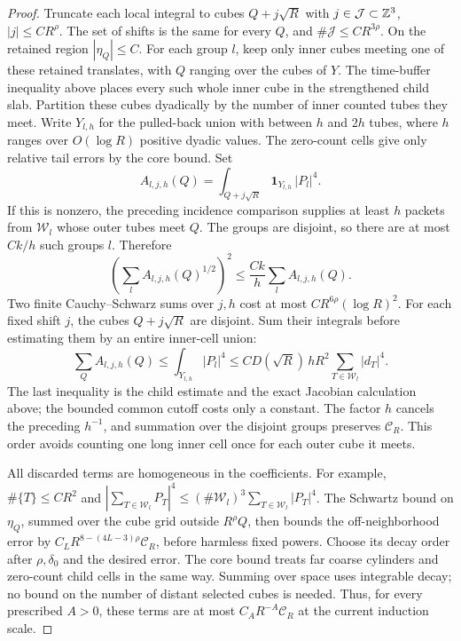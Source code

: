\begin{proof}
Truncate each local integral to cubes \(Q+j\sqrt R\) with
\(j\in\mathcal J\subset\mathbb Z^3\), \(|j|\le C R^\rho\).
The set of shifts is the same for every \(Q\), and
\(\#\mathcal J\le C R^{3\rho}\). On the retained region
\(|\eta_Q|\le C\). For each group \(l\), keep only inner cubes meeting one of these
retained translates, with \(Q\) ranging over the cubes of \(Y\).
The time-buffer inequality above places every such whole inner cube
in the strengthened child slab. Partition these cubes dyadically
by the number of inner counted tubes they meet. Write
\(Y_{l,h}\) for the pulled-back union with between \(h\) and \(2h\)
tubes, where \(h\) ranges over \(O(\log R)\) positive dyadic values.
The zero-count cells give only relative tail errors by the core
bound. Set
\[
 A_{l,j,h}(Q)
   =\int_{Q+j\sqrt R}
             \mathbf1_{Y_{l,h}}\,|P_l|^4.
\]
If this is nonzero, the preceding incidence comparison supplies at
least \(h\) packets from \(\mathcal W_l\) whose outer tubes meet
\(Q\). The groups are disjoint, so there are at most \(Ck/h\)
such groups \(l\). Therefore
\[
 \left(\sum_l A_{l,j,h}(Q)^{1/2}\right)^2
                       \le \frac{Ck}{h}\sum_l A_{l,j,h}(Q).
\]
Two finite Cauchy--Schwarz sums over \(j,h\) cost at most
\(C R^{6\rho}(\log R)^2\).
For each fixed shift \(j\), the cubes \(Q+j\sqrt R\) are disjoint.
Sum their integrals before estimating them by an entire inner-cell
union:
\[
 \sum_Q A_{l,j,h}(Q)\le\int_{Y_{l,h}}|P_l|^4
 \le C D(\sqrt R)\,h R^2
                         \sum_{T\in\mathcal W_l}|d_T|^4.
\]
The last inequality is the child estimate and the exact Jacobian
calculation above; the bounded common cutoff costs only a constant.
The factor \(h\) cancels the preceding \(h^{-1}\), and summation
over the disjoint groups preserves \(\mathcal C_R\). This order
avoids counting one long inner cell once for each outer cube it meets.

All discarded terms are homogeneous in the coefficients. For example,
\(\#\{T\}\le CR^2\) and
\(|\sum_{T\in\mathcal W_l}P_T|^4
 \le(\#\mathcal W_l)^3\sum_{T\in\mathcal W_l}|P_T|^4\).
The Schwartz bound on \(\eta_Q\), summed over the cube grid outside
\(R^\rho Q\), then bounds the off-neighborhood error by
\(C_LR^{8-(4L-3)\rho}\mathcal C_R\), before harmless fixed powers.
Choose its decay order after \(\rho,\delta_0\) and the desired error.
The core bound treats far coarse cylinders and zero-count child cells
in the same way. Summing over space uses integrable decay; no bound
on the number of distant selected cubes is needed.
Thus, for every prescribed \(A>0\), these terms are at most
\(C_A R^{-A}\mathcal C_R\) at the current induction scale.


\end{proof}
